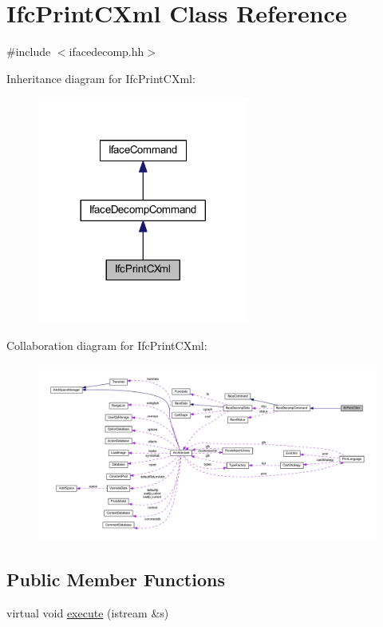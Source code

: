 \hypertarget{class_ifc_print_c_xml}{}\section{Ifc\+Print\+C\+Xml Class Reference}
\label{class_ifc_print_c_xml}


{\ttfamily \#include $<$ifacedecomp.\+hh$>$}



Inheritance diagram for Ifc\+Print\+C\+Xml\+:
\nopagebreak
\begin{figure}[H]
\begin{center}
\leavevmode
\includegraphics[width=197pt]{class_ifc_print_c_xml__inherit__graph}
\end{center}
\end{figure}


Collaboration diagram for Ifc\+Print\+C\+Xml\+:
\nopagebreak
\begin{figure}[H]
\begin{center}
\leavevmode
\includegraphics[width=350pt]{class_ifc_print_c_xml__coll__graph}
\end{center}
\end{figure}
\subsection*{Public Member Functions}
\begin{DoxyCompactItemize}
\item 
virtual void \mbox{\hyperlink{class_ifc_print_c_xml_aee74cbfcd8d9415aaf178283a32f34b9}{execute}} (istream \&s)
\end{DoxyCompactItemize}
